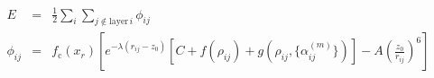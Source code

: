 \documentclass[12pt]{article}
\begin{document}
\begin{eqnarray*}
E &=& \frac{1}{2} \sum_{i} \sum_{j\notin\text{layer}\,i} \phi_{ij} \\\phi_{ij} &=& f_\text{c}(x_r) \left[ e^{-\lambda(r_{ij} - z_0 )} \left[C+f(\rho_{ij})+  g(\rho_{ij}, \{\alpha_{ij}^{(m)}\}) \right]- A\left (\frac{z_0}{r_{ij}} \right)^6 \right] \\
\end{eqnarray*}  



                        
\end{document}
